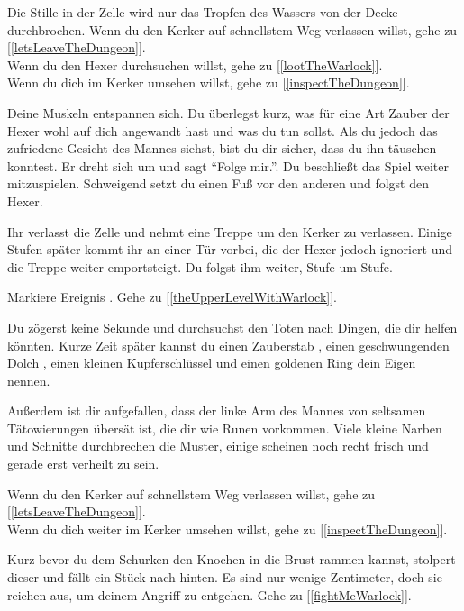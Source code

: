 Die Stille in der Zelle wird nur das Tropfen des Wassers von der Decke durchbrochen. Wenn du den Kerker auf schnellstem Weg verlassen willst, gehe zu [\ref{letsLeaveTheDungeon}].
\\Wenn du den Hexer durchsuchen willst, gehe zu [\ref{lootTheWarlock}].
\\Wenn du dich im Kerker umsehen willst, gehe zu [\ref{inspectTheDungeon}].


Deine Muskeln entspannen sich. Du überlegst kurz, was für eine Art Zauber der Hexer wohl auf dich angewandt hast und was du tun sollst. Als du jedoch das zufriedene Gesicht des Mannes siehst, bist du dir sicher, dass du ihn täuschen konntest. Er dreht sich um und sagt ``Folge mir.''. Du beschließt das Spiel weiter mitzuspielen. Schweigend setzt du einen Fuß vor den anderen und folgst den Hexer.

Ihr verlasst die Zelle und nehmt eine Treppe um den Kerker zu verlassen. Einige Stufen später kommt ihr an einer Tür vorbei, die der Hexer jedoch ignoriert und die Treppe weiter emportsteigt. Du folgst ihm weiter, Stufe um Stufe.

Markiere Ereignis . Gehe zu [\ref{theUpperLevelWithWarlock}].


Du zögerst keine Sekunde und durchsuchst den Toten nach Dingen, die dir helfen könnten.
Kurze Zeit später kannst du einen Zauberstab , einen geschwungenden Dolch , einen kleinen Kupferschlüssel  und einen goldenen Ring  dein Eigen nennen.

Außerdem ist dir aufgefallen, dass der linke Arm des Mannes von seltsamen Tätowierungen übersät ist, die dir wie Runen vorkommen. Viele kleine Narben und Schnitte durchbrechen die Muster, einige scheinen noch recht frisch und gerade erst verheilt zu sein.

Wenn du den Kerker auf schnellstem Weg verlassen willst, gehe zu [\ref{letsLeaveTheDungeon}].
\\Wenn du dich weiter im Kerker umsehen willst, gehe zu [\ref{inspectTheDungeon}].


Kurz bevor du dem Schurken den Knochen in die Brust rammen kannst, stolpert dieser und fällt ein Stück nach hinten. Es sind nur wenige Zentimeter, doch sie reichen aus, um deinem Angriff zu entgehen. Gehe zu [\ref{fightMeWarlock}].

